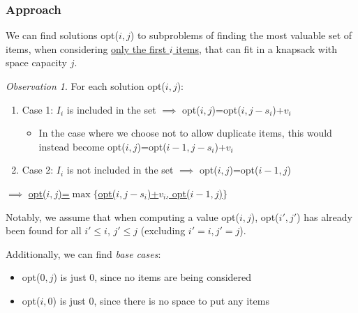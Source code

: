\documentclass[12pt]{extarticle}
\theoremstyle{definition}
\theoremstyle{remark}
\newtheorem*{observation}{Observation}
\begin{document}
\subsubsection*{Approach} 
We can find solutions opt($i,j$) to subproblems of finding the most valuable set of items, when considering \ul{only the first $i$ items}, that can fit in a knapsack with space capacity \ul{$j$}.

\vspace{8pt}
\begin{tcolorbox}[colback=white!95!black]
    \begin{observation}
    For each solution opt($i,j$):\begin{enumerate}
        \item Case 1: $I_i$ is included in the set $\implies$ opt($i,j$)=opt($i,j-s_i$)+$v_i$ \begin{itemize}
            \item In the case where we choose not to allow duplicate items, this would instead become opt($i,j$)=opt($i-1,j-s_i$)+$v_i$
        \end{itemize}
        \item Case 2: $I_i$ is not included in the set $\implies$ opt($i,j$)=opt($i-1,j$)
    \end{enumerate}

    \begin{center}
        $\implies$ \ul{opt($i,j$)=$\max\{$opt($i,j-s_i$)+$v_i$, opt($i-1,j$)$\}$}
    \end{center}
\end{observation}
\end{tcolorbox}

Notably, we assume that when computing a value opt($i,j$), opt($i',j'$) has already been found for all $i'\leq i$, $j'\leq j$ (excluding $i'=i,j'=j$).

\vspace{8pt}
\noindent Additionally, we can find \textit{base cases}: \begin{itemize}
    \item opt($0,j$) is just 0, since no items are being considered
    \item opt($i,0$) is just 0, since there is no space to put any items
\end{itemize}
\end{document}
